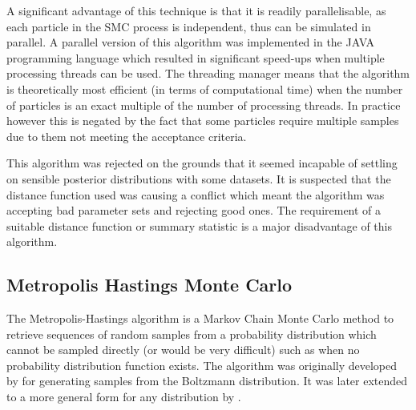 A significant advantage of this technique is that it is readily parallelisable, as each particle in the SMC process is independent, thus can be simulated in parallel. A parallel version of this algorithm was implemented in the JAVA programming language which resulted in significant speed-ups when multiple processing threads can be used. The threading manager means that the algorithm is theoretically most efficient (in terms of computational time) when the number of particles is an exact multiple of the number of processing threads. In practice however this is negated by the fact that some particles require multiple samples due to them not meeting the acceptance criteria.


This algorithm was rejected on the grounds that it seemed incapable of settling on sensible posterior distributions with some datasets. It is suspected that the distance function used was causing a conflict which meant the algorithm was accepting bad parameter sets and rejecting good ones. The requirement of a suitable distance function or summary statistic is a major disadvantage of this algorithm.

\subsection{Metropolis Hastings Monte Carlo}

The Metropolis-Hastings algorithm is a Markov Chain Monte Carlo method to retrieve sequences of random samples from a probability distribution which cannot be sampled directly (or would be very difficult) such as when no probability distribution function exists. The algorithm was originally developed by \citet{Metropolis1953} for generating samples from the Boltzmann distribution. It was later extended to a more general form for any distribution by \citet{Hastings1970}.

